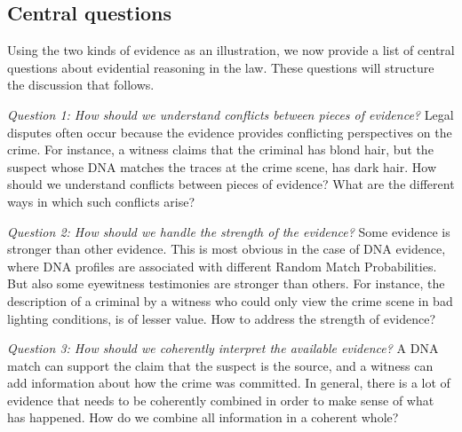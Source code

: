 \documentclass[10pt]{article}
\begin{document}
\subsection{Central questions}

Using the two kinds of evidence as an illustration, we now provide 
a list of central questions about evidential reasoning in the law. 
These questions will structure the discussion that follows.

\textit{Question 1:	How should we understand conflicts between pieces of evidence?}
Legal disputes often occur because 
the evidence provides conflicting perspectives on the crime. For instance, a witness claims that the criminal has blond hair, 
but the suspect whose DNA matches the traces at the crime scene, has dark hair. %
How should we understand conflicts between pieces of evidence? What are the different 
ways in which such conflicts arise?

\textit{Question 2:	How should we handle the strength of the evidence?}
Some evidence is stronger than other evidence. This is most obvious in the case of DNA evidence, where DNA profiles are associated with different Random Match Probabilities. But also some eyewitness testimonies are stronger than others. For instance, the description of a criminal by a witness who could only view the crime scene in bad lighting conditions, is of lesser value. How to address the strength of evidence?

\textit{Question 3:	How should we coherently interpret the available evidence?}
A DNA match can support the claim that the suspect is the source, and a witness can add information about how the crime was committed. In general, there is a lot of evidence that needs to be coherently combined in order to make sense of what has happened. How do we combine all information in a coherent whole?

\end{document}
